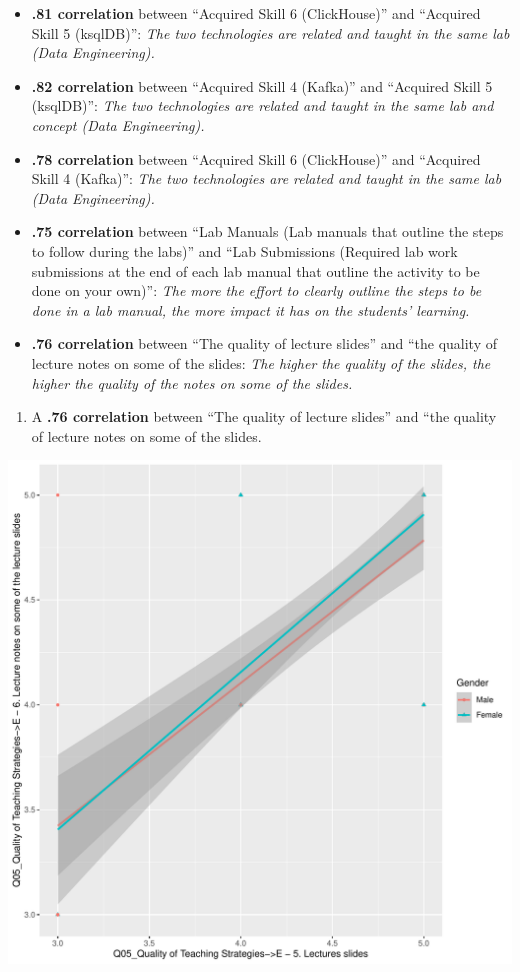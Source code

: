 \documentclass[
]{article}
\providecommand{\tightlist}{%
  \setlength{\itemsep}{0pt}\setlength{\parskip}{0pt}}
\begin{document}
\begin{itemize}
\item
  \textbf{.81 correlation} between ``Acquired Skill 6 (ClickHouse)'' and
  ``Acquired Skill 5 (ksqlDB)'': \emph{The two technologies are related
  and taught in the same lab (Data Engineering).}
\item
  \textbf{.82 correlation} between ``Acquired Skill 4 (Kafka)'' and
  ``Acquired Skill 5 (ksqlDB)'': \emph{The two technologies are related
  and taught in the same lab and concept (Data Engineering).}
\item
  \textbf{.78 correlation} between ``Acquired Skill 6 (ClickHouse)'' and
  ``Acquired Skill 4 (Kafka)'': \emph{The two technologies are related
  and taught in the same lab (Data Engineering).}
\item
  \textbf{.75 correlation} between ``Lab Manuals (Lab manuals that
  outline the steps to follow during the labs)'' and ``Lab Submissions
  (Required lab work submissions at the end of each lab manual that
  outline the activity to be done on your own)'': \emph{The more the
  effort to clearly outline the steps to be done in a lab manual, the
  more impact it has on the students' learning.}
\item
  \textbf{.76 correlation} between ``The quality of lecture slides'' and
  ``the quality of lecture notes on some of the slides: \emph{The higher
  the quality of the slides, the higher the quality of the notes on some
  of the slides.}
\end{itemize}

\begin{enumerate}
\def\labelenumi{(\arabic{enumi})}
\tightlist
\item
  A \textbf{.76 correlation} between ``The quality of lecture slides''
  and ``the quality of lecture notes on some of the slides.
\end{enumerate}

\includegraphics{10.b.BBT4206-End-SemesterCourseEvaluation-20230821-20231128-BI2-BBIT4-2_files/figure-latex/DrillDownCorr1-1.pdf}
\end{document}
